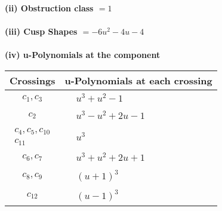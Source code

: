 \documentclass[1p]{elsarticle_modified}
\theoremstyle{definition}
\begin{document}
\flushleft \textbf{(ii) Obstruction class $= 1$}\\~\\
\flushleft \textbf{(iii) Cusp Shapes $= -6 u^2-4 u-4$}\\~\\
\newpage\renewcommand{\arraystretch}{1}
\flushleft \textbf{(iv) u-Polynomials at the component}\newline \\
\begin{tabular}{m{50pt}|m{274pt}}
Crossings & \hspace{64pt}u-Polynomials at each crossing \\
\hline $$\begin{aligned}c_{1},c_{3}\end{aligned}$$&$\begin{aligned}
&u^3+u^2-1
\end{aligned}$\\
\hline $$\begin{aligned}c_{2}\end{aligned}$$&$\begin{aligned}
&u^3- u^2+2 u-1
\end{aligned}$\\
\hline $$\begin{aligned}c_{4},c_{5},c_{10}\\c_{11}\end{aligned}$$&$\begin{aligned}
&u^3
\end{aligned}$\\
\hline $$\begin{aligned}c_{6},c_{7}\end{aligned}$$&$\begin{aligned}
&u^3+u^2+2 u+1
\end{aligned}$\\
\hline $$\begin{aligned}c_{8},c_{9}\end{aligned}$$&$\begin{aligned}
&(u+1)^3
\end{aligned}$\\
\hline $$\begin{aligned}c_{12}\end{aligned}$$&$\begin{aligned}
&(u-1)^3
\end{aligned}$\\
\hline
\end{tabular}\\~\\
\end{document}
